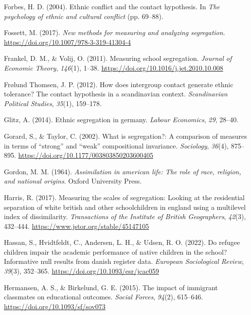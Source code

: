 \documentclass[
]{book}
\newlength{\cslhangindent}
\newenvironment{CSLReferences}[2] %
 {\begin{list}{}{%
  \setlength{\itemindent}{0pt}
  \setlength{\leftmargin}{0pt}
  \setlength{\parsep}{0pt}
  \ifodd #1
   \setlength{\leftmargin}{\cslhangindent}
   \setlength{\itemindent}{-1\cslhangindent}
  \fi
  \setlength{\itemsep}{#2\baselineskip}}}
 {\end{list}}
\begin{document}
\begin{CSLReferences}{1}{0}
Forbes, H. D. (2004). Ethnic conflict and the contact hypothesis. In \emph{The psychology of ethnic and cultural conflict} (pp. 69--88).

Fossett, M. (2017). \emph{New methods for measuring and analyzing segregation}. \url{https://doi.org/10.1007/978-3-319-41304-4}

Frankel, D. M., \& Volij, O. (2011). Measuring school segregation. \emph{Journal of Economic Theory}, \emph{146}(1), 1--38. \url{https://doi.org/10.1016/j.jet.2010.10.008}

Frølund Thomsen, J. P. (2012). How does intergroup contact generate ethnic tolerance? The contact hypothesis in a scandinavian context. \emph{Scandinavian Political Studies}, \emph{35}(1), 159--178.

Glitz, A. (2014). Ethnic segregation in germany. \emph{Labour Economics}, \emph{29}, 28--40.

Gorard, S., \& Taylor, C. (2002). What is segregation?: A comparison of measures in terms of {``strong''} and {``weak''} compositional invariance. \emph{Sociology}, \emph{36}(4), 875--895. \url{https://doi.org/10.1177/003803850203600405}

Gordon, M. M. (1964). \emph{Assimilation in american life: The role of race, religion, and national origins}. Oxford University Press.

Harris, R. (2017). Measuring the scales of segregation: Looking at the residential separation of white british and other schoolchildren in england using a multilevel index of dissimilarity. \emph{Transactions of the Institute of British Geographers}, \emph{42}(3), 432--444. \url{https://www.jstor.org/stable/45147105}

Hassan, S., Hvidtfeldt, C., Andersen, L. H., \& Udsen, R. O. (2022). Do refugee children impair the academic performance of native children in the school? Informative null results from danish register data. \emph{European Sociological Review}, \emph{39}(3), 352--365. \url{https://doi.org/10.1093/esr/jcac059}

Hermansen, A. S., \& Birkelund, G. E. (2015). The impact of immigrant classmates on educational outcomes. \emph{Social Forces}, \emph{94}(2), 615--646. \url{https://doi.org/10.1093/sf/sov073}


\end{CSLReferences}
\end{document}
